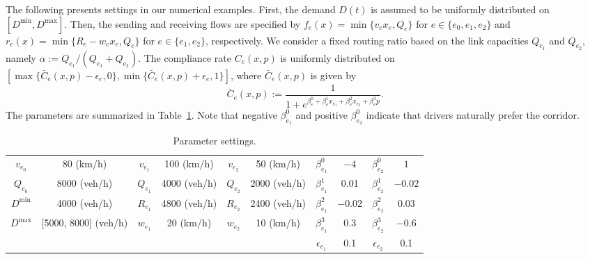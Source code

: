 The following presents settings in our numerical examples. First, the demand $D(t)$ is assumed to be uniformly distributed on $[D^{\min}, D^{\max}]$. Then, the sending and receiving flows are specified by $f_{e}(x) = \min\{v_{e}x_{e}, Q_{e}\}$ for $e\in\{e_0, e_1, e_2\}$ and $r_{e}(x) = \min\{R_{e}-w_{e}x_{e},  Q_{e}\}$ for $e\in\{e_1, e_2\}$, respectively. 
We consider a fixed routing ratio based on the link capacities $Q_{e_1}$ and $Q_{e_2}$, namely  $\alpha:=Q_{e_1}/(Q_{e_1}+Q_{e_2})$. The compliance rate $C_e(x,p)$ is uniformly distributed on  $[\max\{\bar{C}_e(x, p)-\epsilon_e, 0\}, \min\{\bar{C}_e(x, p)+\epsilon_e, 1\}]$, where $\bar{C}_e(x, p)$ is given by
\begin{equation*}
    \bar{C}_e(x, p) := \frac{1}{1+e^{\beta_{e}^0+\beta_{e}^1 x_{e_1} + \beta_{e}^2 x_{e_2} + \beta_{e}^3 p}}.    
\end{equation*}
The parameters are summarized in Table~\ref{tab_para}. Note that negative $\beta_{e_1}^0$ and positive $\beta_{e_2}^0$ indicate that drivers naturally prefer the corridor.
\begin{table}[htbp]
    \centering
    \caption{Parameter settings.}
    \small
    \begin{tabular}{ cc|cc|cc|cc|cc }
    \hline
    $v_{e_0}$ & 80 (km/h)   & $v_{e_1}$ & 100 (km/h)  & $v_{e_2}$ & 50 (km/h)  & $\beta_{e_1}^0$ & $-4$ & $\beta_{e_2}^0$ & $1$ \\ 
    $Q_{e_0}$ & 8000 (veh/h) & $Q_{e_1}$ & 4000 (veh/h) & $Q_{e_2}$ & 2000 (veh/h)  & $\beta_{e_1}^1$ & 0.01 & $\beta_{e_2}^1$ & $-0.02$ \\ 
     $D^{\min}$  & 4000 (veh/h)     & $R_{e_1}$ &  4800 (veh/h)    & $R_{e_2}$ & 2400 (veh/h) &  $\beta_{e_1}^2$ & $-0.02$ & $\beta_{e_2}^2$ & $0.03$ \\ 
     $D^{\max}$      & [5000, 8000] (veh/h)  & $w_{e_1}$ & 20 (km/h)   & $w_{e_2}$ & 10 (km/h)  & $\beta_{e_1}^3$ & $0.3$ & $\beta_{e_2}^3$ & $-0.6$ \\ 
           & & & & & & $\epsilon_{e_1}$ & 0.1 & $\epsilon_{e_2}$ & 0.1  \\
    \hline
    \end{tabular}
    \label{tab_para}
\end{table}

